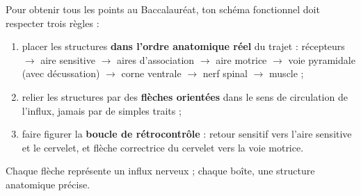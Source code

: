 \documentclass[11pt]{article}
\begin{document}
\begin{methode}
Pour obtenir tous les points au Baccalauréat, ton schéma fonctionnel doit respecter trois règles :
\begin{enumerate}
\item placer les structures \textbf{dans l'ordre anatomique réel} du trajet : récepteurs $\to$ aire sensitive $\to$ aires d'association $\to$ aire motrice $\to$ voie pyramidale (avec décussation) $\to$ corne ventrale $\to$ nerf spinal $\to$ muscle ;
\item relier les structures par des \textbf{flèches orientées} dans le sens de circulation de l'influx, jamais par de simples traits ;
\item faire figurer la \textbf{boucle de rétrocontrôle} : retour sensitif vers l'aire sensitive et le cervelet, et flèche correctrice du cervelet vers la voie motrice.
\end{enumerate}
Chaque flèche représente un influx nerveux ; chaque boîte, une structure anatomique précise.
\end{methode}
\end{document}
